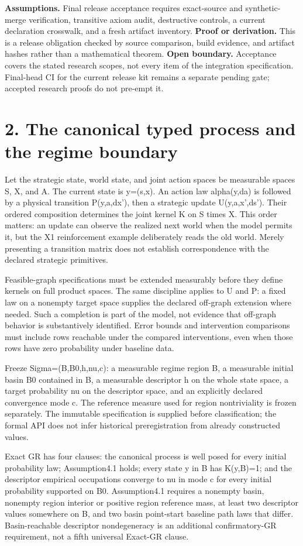 \documentclass[11pt,a4paper]{article}
\begin{document}
\textbf{Assumptions.} Final release acceptance requires exact-source and synthetic-merge verification, transitive axiom audit, destructive controls, a current declaration crosswalk, and a fresh artifact inventory.
\textbf{Proof or derivation.} This is a release obligation checked by source comparison, build evidence, and artifact hashes rather than a mathematical theorem.
\textbf{Open boundary.} Acceptance covers the stated research scopes, not every item of the integration specification. Final-head CI for the current release kit remains a separate pending gate; accepted research proofs do not pre-empt it.
\section{2. The canonical typed process and the regime boundary}
Let the strategic state, world state, and joint action spaces be measurable spaces S, X, and A. The current state is y=(s,x). An action law alpha(y,da) is followed by a physical transition P(y,a,dx'), then a strategic update U(y,a,x',ds'). Their ordered composition determines the joint kernel K on S times X. This order matters: an update can observe the realized next world when the model permits it, but the X1 reinforcement example deliberately reads the old world. Merely presenting a transition matrix does not establish correspondence with the declared strategic primitives.

Feasible-graph specifications must be extended measurably before they define kernels on full product spaces. The same discipline applies to U and P: a fixed law on a nonempty target space supplies the declared off-graph extension where needed. Such a completion is part of the model, not evidence that off-graph behavior is substantively identified. Error bounds and intervention comparisons must include rows reachable under the compared interventions, even when those rows have zero probability under baseline data.

Freeze Sigma=(B,B0,h,nu,c): a measurable regime region B, a measurable initial basin B0 contained in B, a measurable descriptor h on the whole state space, a target probability nu on the descriptor space, and an explicitly declared convergence mode c. The reference measure used for region nontriviality is frozen separately. The immutable specification is supplied before classification; the formal API does not infer historical preregistration from already constructed values.

Exact GR has four clauses: the canonical process is well posed for every initial probability law; Assumption4.1 holds; every state y in B has K(y,B)=1; and the descriptor empirical occupations converge to nu in mode c for every initial probability supported on B0. Assumption4.1 requires a nonempty basin, nonempty region interior or positive region reference mass, at least two descriptor values somewhere on B, and two basin point-start baseline path laws that differ. Basin-reachable descriptor nondegeneracy is an additional confirmatory-GR requirement, not a fifth universal Exact-GR clause.
\end{document}
